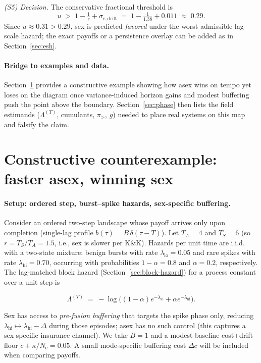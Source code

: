 \documentclass[11pt]{article}
\theoremstyle{upright}
\newcommand{\Ne}{N_{\mathrm{e}}}
\newcommand{\hazT}[1]{\Lambda^{(#1)}}          %
\begin{document}
\emph{(S5) Decision.} The conservative fractional threshold is
\[
u \;>\; 1-\tfrac{1}{r} + \sigma_{c,\mathrm{drift}}
\;=\; 1-\tfrac{1}{1.38}+0.011 \;\approx\; 0.29.
\]
Since \(u\approx 0.31>0.29\), sex is predicted \emph{favored} under the worst admissible lag-scale hazard; the exact payoffs or a persistence overlay can be added as in Section~\ref{sec:esh}.

\paragraph{Bridge to examples and data.}
Section~\ref{sec:example} provides a constructive example showing how asex wins on tempo yet loses on the diagram once variance-induced horizon gains and modest buffering push the point above the boundary. Section~\ref{sec:phase} then lists the field estimands ($\hazT{T}$, cumulants, $\pi_{>}$, $g$) needed to place real systems on this map and falsify the claim.

\section{Constructive counterexample: faster asex, winning sex}
\label{sec:example}

\paragraph{Setup: ordered step, burst–spike hazards, sex-specific buffering.}
Consider an ordered two-step landscape whose payoff arrives only upon completion (single-lag profile $b(\tau)=B\,\delta(\tau-T)$). Let $T_A=4$ and $T_S=6$ (so $r=T_S/T_A=1.5$, i.e., sex is slower per K\&K). Hazards per unit time are i.i.d. with a two-state mixture: benign bursts with rate $\lambda_{\mathrm{lo}}=0.05$ and rare spikes with rate $\lambda_{\mathrm{hi}}=0.70$, occurring with probabilities $1-\alpha=0.8$ and $\alpha=0.2$, respectively. The lag-matched block hazard (Section~\ref{sec:block-hazard}) for a process constant over a unit step is

$$
\hazT{T} \;=\; -\log\!\Big((1-\alpha)e^{-\lambda_{\mathrm{lo}}}+\alpha e^{-\lambda_{\mathrm{hi}}}\Big).
$$

Sex has access to \emph{pre-fusion buffering} that targets the spike phase only, reducing $\lambda_{\mathrm{hi}}\mapsto \lambda_{\mathrm{hi}}-\Delta$ during those episodes; asex has no such control (this captures a sex-specific insurance channel). We take $B=1$ and a modest baseline cost+drift floor $c+\kappa/\Ne=0.05$. A small mode-specific buffering cost $\Delta c$ will be included when comparing payoffs.
\end{document}
